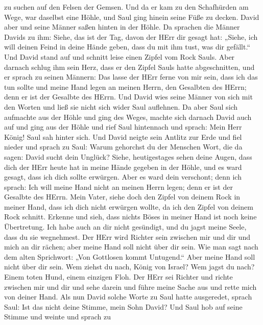 zu suchen auf den Felsen der Gemsen.  Und da er kam zu den
Schafhürden am Wege, war daselbst eine Höhle, und Saul ging hinein seine
Füße zu decken. David aber und seine Männer saßen hinten in der Höhle.
 Da sprachen die Männer Davids zu ihm: Siehe, das ist der
Tag, davon der HErr dir gesagt hat: „Siehe, ich will deinen Feind in
deine Hände geben, dass du mit ihm tust, was dir gefällt.`` Und David
stand auf und schnitt leise einen Zipfel vom Rock Sauls. 
Aber darnach schlug ihm sein Herz, dass er den Zipfel Sauls hatte
abgeschnitten,  und er sprach zu seinen Männern: Das lasse
der HErr ferne von mir sein, dass ich das tun sollte und meine Hand
legen an meinen Herrn, den Gesalbten des HErrn; denn er ist der Gesalbte
des HErrn.  Und David wies seine Männer von sich mit den
Worten und ließ sie nicht sich wider Saul auflehnen. Da aber Saul sich
aufmachte aus der Höhle und ging des Weges,  machte sich
darnach David auch auf und ging aus der Höhle und rief Saul hintennach
und sprach: Mein Herr König! Saul sah hinter sich. Und David neigte sein
Antlitz zur Erde und fiel nieder  und sprach zu Saul: Warum
gehorchst du der Menschen Wort, die da sagen: David sucht dein Unglück?
 Siehe, heutigestages sehen deine Augen, dass dich der HErr
heute hat in meine Hände gegeben in der Höhle, und es ward gesagt, dass
ich dich sollte erwürgen. Aber es ward dein verschont; denn ich sprach:
Ich will meine Hand nicht an meinen Herrn legen; denn er ist der
Gesalbte des HErrn.  Mein Vater, siehe doch den Zipfel von
deinem Rock in meiner Hand, dass ich dich nicht erwürgen wollte, da ich
den Zipfel von deinem Rock schnitt. Erkenne und sieh, dass nichts Böses
in meiner Hand ist noch keine Übertretung. Ich habe auch an dir nicht
gesündigt, und du jagst meine Seele, dass du sie wegnehmest.
 Der HErr wird Richter sein zwischen mir und dir und mich
an dir rächen; aber meine Hand soll nicht über dir sein. 
Wie man sagt nach dem alten Sprichwort: „Von Gottlosen kommt Untugend.``
Aber meine Hand soll nicht über dir sein.  Wem ziehst du
nach, König von Israel? Wem jagst du nach? Einem toten Hund, einem
einzigen Floh.  Der HErr sei Richter und richte zwischen
mir und dir und sehe darein und führe meine Sache aus und rette mich von
deiner Hand.  Als nun David solche Worte zu Saul hatte
ausgeredet, sprach Saul: Ist das nicht deine Stimme, mein Sohn David?
Und Saul hob auf seine Stimme und weinte  und sprach zu
